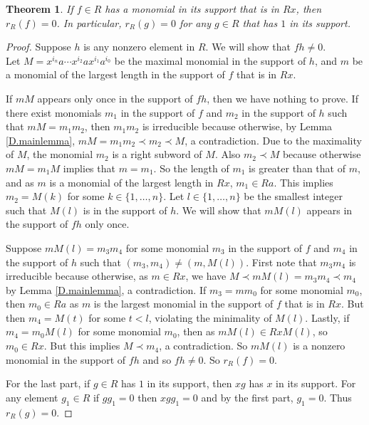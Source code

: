 \documentclass[10pt,a4paper]{amsart}
\newtheorem{thm}{Theorem}
\begin{document}
	\begin{thm}\label{D.mainthm}
		If $f \in R$ has a monomial in its support that is in $Rx$, then $r_R(f) = 0$. In particular,  $r_R(g) = 0$ for any $g \in R$ that has $1$ in its support.
	\end{thm}

	\begin{proof}
		Suppose $h$ is any nonzero element in $R$. We will show that $fh \neq 0$.\\
		Let $M = x^{i_{n}}a\cdots x^{i_{2}}ax^{i_1}a^{i_0}$ be the maximal monomial in the support of $h$, and $m$ be a monomial of the largest length in the support of $f$ that is in $Rx$. 
		
		If $mM$ appears only once in the support of $fh$, then we have nothing to prove. If there exist monomials $m_1$ in the support of $f$ and $m_2$ in the support of $h$ such that $mM = m_1 m_2$, then $m_1m_2$ is irreducible because otherwise, by Lemma \ref{D.mainlemma}, $mM = m_1m_2 \prec m_2 \prec M$, a contradiction. Due to the maximality of $M$, the monomial $m_2$ is a right subword of $M$. Also $m_2 \prec M$ because otherwise $mM = m_1M$ implies that $m = m_1$. So the length of $m_1$ is greater than that of $m$, and as $m$ is a monomial of the largest length in $Rx$,  $m_1 \in  Ra$. This implies $m_2 = M(k)$ for some $k \in \{1, \ldots, n\}$. Let $l \in \{1,\ldots, n\}$ be the smallest integer such that $M(l)$ is in the support of $h$. We will show that $mM(l)$ appears in the support of $fh$ only once.
		
		Suppose $mM(l) = m_3m_4$ for some monomial $m_3$ in the support of $f$ and $m_4$ in the support of $h$ such that $(m_3, m_4) \neq (m, M(l))$. First note that $m_3m_4$ is irreducible because otherwise, as $m \in Rx$, we have $M \prec mM(l) = m_3m_4  \prec  m_4$ by Lemma \ref{D.mainlemma}, a contradiction. If $m_3 = mm_0$ for some monomial $m_0$, then $m_0  \in Ra$ as $m$ is the largest monomial in the support of $f$ that is in $Rx$. But then $m_4 = M(t)$ for some $t < l$, violating the minimality of $M(l)$. Lastly, if $m_4 = m_0M(l)$ for some monomial $m_0$, then as $mM(l) \in RxM(l)$, so $m_0 \in Rx$. But this implies  $M \prec m_4$,  a contradiction.  
		So $mM(l)$ is a nonzero monomial in the support of $fh$ and so $fh \neq 0$. So $r_{ R}(f)=0$.
		
		For the last part, if $g \in R$ has $1$ in its support, then $xg$ has $x$ in its support. For any element $g_1 \in R$ if $gg_1 = 0$ then $xgg_1 = 0$ and by the first part, $g_1 = 0$. Thus $r_R(g) = 0$. 
	\end{proof} 
\end{document}
